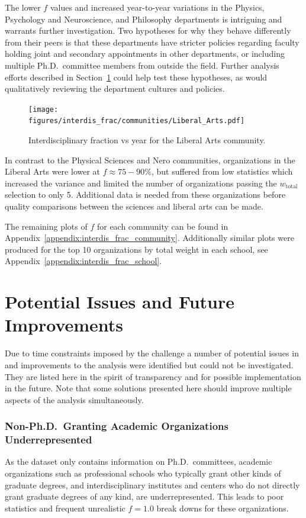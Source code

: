 \documentclass[notitlepage,aps,prd,nofootinbib]{revtex4-1}
\newcommand{\figures}{../outputs/plots}
\begin{document}
The lower $f$ values and increased year-to-year variations in the Physics, Psychology and Neuroscience, and Philosophy departments is intriguing and warrants further investigation. Two hypotheses for why they behave differently from their peers is that these departments have stricter policies regarding faculty holding joint and secondary appointments in other departments, or including multiple Ph.D.\ committee members from outside the field. Further analysis efforts described in Section~\ref{sec:future} could help test these hypotheses, as would qualitatively reviewing the department cultures and policies.

\begin{figure}[!htb]\centering
  \texttt{[image: \\figures/interdis\_frac/communities/Liberal\_Arts.pdf]}
  \caption{Interdisciplinary fraction vs year for the Liberal Arts community.}
  \label{fig:interdis_frac_liberal_arts}
\end{figure}

In contrast to the Physical Sciences and Nero communities, organizations in the Liberal Arts were lower at $f \approx 75-90\%$, but suffered from low statistics which increased the variance and limited the number of organizations passing the $w_{\text{total}}$ selection to only 5. Additional data is needed from these organizations before quality comparisons between the sciences and liberal arts can be made.

The remaining plots of $f$ for each community can be found in Appendix~\ref{appendix:interdis_frac_community}. Additionally similar plots were produced for the top 10 organizations by total weight in each school, see Appendix~\ref{appendix:interdis_frac_school}.


\section{Potential Issues and Future Improvements}
\label{sec:future}
Due to time constraints imposed by the challenge a number of potential issues in and improvements to the analysis were identified but could not be investigated. They are listed here in the spirit of transparency and for possible implementation in the future. Note that some solutions presented here should improve multiple aspects of the analysis simultaneously.

\subsubsection{Non-Ph.D.\ Granting Academic Organizations Underrepresented}
As the  dataset only contains information on Ph.D.\ committees, academic organizations such as professional schools who typically grant other kinds of graduate degrees, and interdisciplinary institutes and centers who do not directly grant graduate degrees of any kind, are underrepresented. This leads to poor statistics and frequent unrealistic $f=1.0$ break downs for these organizations.
\end{document}
